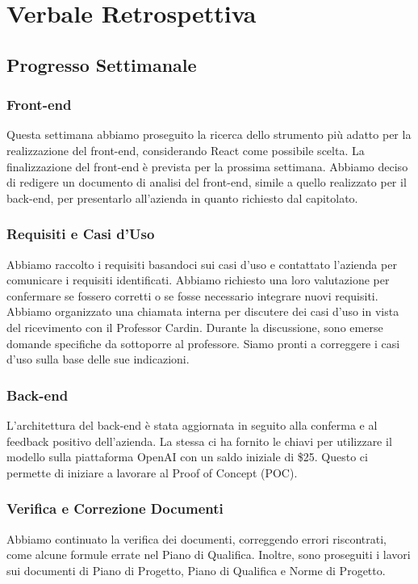 \documentclass{article}
\begin{document}
\newpage
\section{Verbale Retrospettiva}

\subsection{Progresso Settimanale}
\subsubsection{Front-end}
Questa settimana abbiamo proseguito la ricerca dello strumento più adatto per la realizzazione del front-end, considerando React come possibile scelta. La finalizzazione del front-end è prevista per la prossima settimana.  
Abbiamo deciso di redigere un documento di analisi del front-end, simile a quello realizzato per il back-end, per presentarlo all'azienda in quanto richiesto dal capitolato.

\subsubsection{Requisiti e Casi d'Uso}
Abbiamo raccolto i requisiti basandoci sui casi d'uso e contattato l'azienda per comunicare i requisiti identificati. Abbiamo richiesto una loro valutazione per confermare se fossero corretti o se fosse necessario integrare nuovi requisiti.  
Abbiamo organizzato una chiamata interna per discutere dei casi d'uso in vista del ricevimento con il Professor Cardin. Durante la discussione, sono emerse domande specifiche da sottoporre al professore. Siamo pronti a correggere i casi d'uso sulla base delle sue indicazioni.

\subsubsection{Back-end}
L'architettura del back-end è stata aggiornata in seguito alla conferma e al feedback positivo dell'azienda. La stessa ci ha fornito le chiavi per utilizzare il modello sulla piattaforma OpenAI con un saldo iniziale di \$25. Questo ci permette di iniziare a lavorare al Proof of Concept (POC).

\subsubsection{Verifica e Correzione Documenti}
Abbiamo continuato la verifica dei documenti, correggendo errori riscontrati, come alcune formule errate nel Piano di Qualifica. Inoltre, sono proseguiti i lavori sui documenti di Piano di Progetto, Piano di Qualifica e Norme di Progetto.
\end{document}
